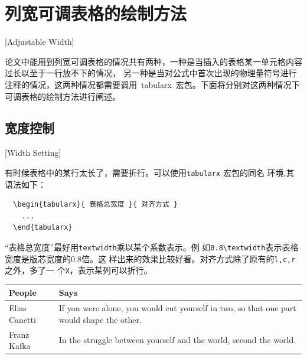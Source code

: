 \section{列宽可调表格的绘制方法}[Adjustable Width]

论文中能用到列宽可调表格的情况共有两种，一种是当插入的表格某一单元格内容过长以至于一行放不下的情况，
另一种是当对公式中首次出现的物理量符号进行注释的情况，这两种情况都需要调用~tabularx~宏包。下面将分别对这两种情况下可调表格的绘制方法进行阐述。

\subsection{宽度控制}[Width Setting]

有时候表格中的某行太长了，需要折行。可以使用\texttt{tabularx} 宏包的同名
环境,其语法如下：

\begin{lstlisting}
  \begin{tabularx}{ 表格总宽度 }{ 对齐方式 }
    ...
  \end{tabularx}
\end{lstlisting}

“表格总宽度”最好用\texttt{textwidth}乘以某个系数表示。例
如\texttt{0.8\textbackslash{textwidth}}表示表格宽度是版芯宽度的0.8倍。这
样出来的效果比较好看。对齐方式除了原有的\texttt{l,c,r}之外，多了一
个\texttt{X}，表示某列可以折行。

\begin{table}[htbp]
  \centering
  \vspace{0.2cm}
  \wuhao
  \begin{tabularx}{0.8\textwidth{}}{lX}
    \toprule
    People        & Says                                                 \\
    \midrule
    Elias Canetti & If you were alone, you would cut yourself in two, so
    that one part would shape the other.                                 \\
    Franz Kafka   & In the struggle between yourself and the world,
    second the world.                                                    \\
    \bottomrule
  \end{tabularx}
\end{table}

